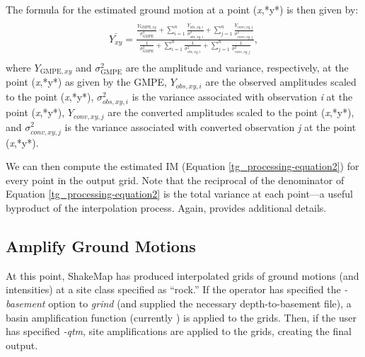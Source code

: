 \documentclass[letterpaper,10pt,english]{sphinxmanual}
\begin{document}
The formula for the estimated ground motion at a point (\emph{x},*y*) is then given by:
\label{tg_processing:equation-equation2}\begin{align}\label{tg_processing-equation2}\begin{aligned}
\begin{split}\overline{Y_{xy}} = \frac{\displaystyle\frac{Y_{\text{GMPE},xy}}{\sigma_{\text{GMPE}}^2} + \displaystyle\sum_{i=1}^{n}\frac{Y_{obs,xy,i}}{\sigma_{obs,xy,i}^2} + \displaystyle\sum_{j=1}^{n}\frac{Y_{conv,xy,j}}{\sigma_{conv,xy,j}^2}}{\displaystyle\frac{1}{\sigma_{\text{GMPE}}^2} + \displaystyle\sum_{i=1}^{n}\frac{1}{\sigma_{obs,xy,i}^2} + \displaystyle\sum_{j=1}^{n}\frac{1}{\sigma_{conv,xy,j}^2}},\end{split}\end{aligned}\end{align}
where \(Y_{\text{GMPE},xy}\) and \(\sigma_{\text{GMPE}}^2\) are the amplitude and variance, respectively, at the point (\emph{x},*y*)
as given by the GMPE, \(Y_{obs,xy,i}\) are the observed amplitudes scaled to the point (\emph{x},*y*),
\(\sigma_{obs,xy,i}^2\) is the variance associated with observation \emph{i} at the point (\emph{x},*y*), \(Y_{conv,xy,j}\) are the
converted amplitudes scaled to the point (\emph{x},*y*), and \(\sigma_{conv,xy,j}^2\) is the variance associated
with converted observation \emph{j} at the point (\emph{x},*y*).

We can then compute the estimated IM (Equation \eqref{tg_processing-equation2}) for every point in the output grid. Note that the
reciprocal of the denominator of Equation \eqref{tg_processing-equation2} is the total variance at each point---a useful
byproduct of the interpolation process. Again, {\hyperref[references:worden2010]{}} provides additional
details.


\subsection{Amplify Ground Motions}
\label{tg_processing:amplify-ground-motions}\label{tg_processing:id1}
At this point, ShakeMap has produced interpolated grids of ground motions (and
intensities) at a site class specified as ``rock.'' If the operator has specified the \emph{-basement}
option to \emph{grind} (and supplied the necessary depth-to-basement file), a
basin amplification function (currently {\hyperref[references:field2000]{}}) is applied to the grids. Then, if the user has
specified \emph{-qtm}, site amplifications are applied to the grids, creating the final output.
\end{document}
